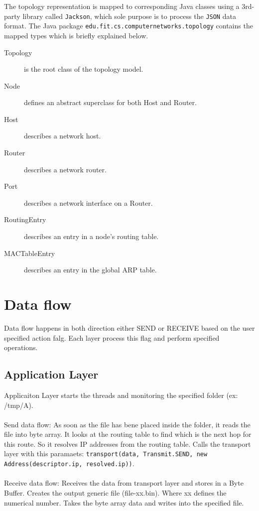 \documentclass{scrartcl}
\begin{document}
The topology representation is mapped to corresponding Java classes using a 3rd-party library called \texttt{Jackson}, which sole purpose is to process the \texttt{JSON} data format. The Java package \texttt{edu.fit.cs.computernetworks.topology} contains the mapped types which is briefly explained below.

\begin{description}
\item[Topology] is the root class of the topology model.
\item[Node] defines an abstract superclass for both Host and Router.
\item[Host] describes a network host.
\item[Router] describes a network router.
\item[Port] describes a network interface on a Router.
\item[RoutingEntry] describes an entry in a node's routing table.
\item[MACTableEntry] describes an entry in the global ARP table.
\end{description}

\section{Data flow}
Data flow happens in both direction either SEND or RECEIVE based on the user specified action falg. Each layer process this flag and perform specified operations.
\subsection{Application Layer}
Applicaiton Layer starts the threads and monitoring the specified folder (ex: /tmp/A). \\ \\
Send data flow:
As soon as the file has bene placed inside the folder, it reads the file into byte array. It looks at the routing table to find which is the next hop for this route. So it resolves IP addresses from the routing table. Calls the transport layer with this paramaets: \texttt{transport(data, Transmit.SEND, new Address(descriptor.ip, resolved.ip))}. \\ \\
Receive data flow:
Receives the data from transport layer and stores in a Byte Buffer. Creates the output generic file (file-xx.bin). Where xx defines the numerical number. Takes the byte array data and writes into the specified file.
\end{document}
